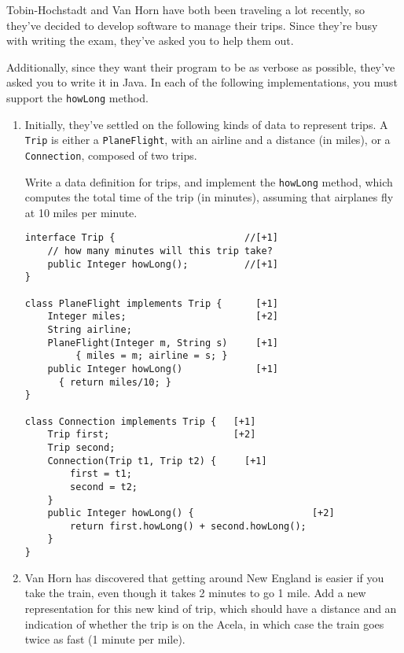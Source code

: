 \documentclass[12pt]{article}                   %
\def\pts#1{\marginpar{\footnotesize \raggedright  \fbox{#1 {\sc Points}}}}
\newenvironment{solution}{}{}
\begin{document}
\begin{problem}\pts{22}

Tobin-Hochstadt and Van Horn have both been traveling a lot recently,
so they've decided to develop software to manage their trips.  Since
they're busy with writing the exam, they've asked you to help them
out. 

Additionally, since they want their program to be as verbose as
possible, they've asked you to write it in Java.  
%
In each of the following implementations, you must support the
\verb|howLong| method.

\begin{enumerate}
\item
Initially, they've settled on the following kinds of data to represent
trips.  A {\tt Trip} is either a {\tt PlaneFlight}, with an airline
and a distance (in miles), or a {\tt Connection}, composed of two trips.  

Write a data definition for trips, and implement the {\tt howLong}
method, which computes the total time of the trip (in minutes),
assuming that airplanes fly at 10 miles per minute.

\begin{solution}
\begin{verbatim}
interface Trip {                       //[+1]
    // how many minutes will this trip take? 
    public Integer howLong();          //[+1]
}

class PlaneFlight implements Trip {      [+1]
    Integer miles;                       [+2]
    String airline;
    PlaneFlight(Integer m, String s)     [+1]
         { miles = m; airline = s; }   
    public Integer howLong()             [+1]
      { return miles/10; }
}

class Connection implements Trip {   [+1]
    Trip first;                      [+2]
    Trip second;
    Connection(Trip t1, Trip t2) {     [+1]
        first = t1; 
        second = t2; 
    }
    public Integer howLong() {                     [+2]
        return first.howLong() + second.howLong(); 
    }
}
\end{verbatim}
\end{solution}

\newpage
\item
Van Horn has discovered that getting around New England is easier if
you take the train, even though it takes 2 minutes to go 1 mile.  Add a new representation for this new kind of
trip, which should have a distance and an indication of whether the trip
is on the Acela, in which case the train goes twice as fast (1 minute
per mile).


\end{enumerate}
\end{problem}
\end{document}
